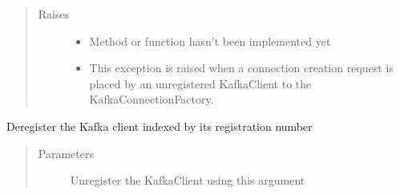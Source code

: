 \documentclass[letterpaper,10pt,english]{sphinxmanual}
\begin{document}
\begin{fulllineitems}
\begin{fulllineitems}
\begin{quote}
\begin{description}
\item[{Raises}] \leavevmode\begin{itemize}
\item {} 
\sphinxAtStartPar
{} \textendash{} Method or function hasn’t been implemented yet

\item {} 
\sphinxAtStartPar
{\hyperref[\detokenize{Forge:Forge.KafkaClientNotRegisteredError}]{}} \textendash{} This exception is raised when a connection creation request is placed by an
    unregistered KafkaClient to the KafkaConnectionFactory.

\end{itemize}

\end{description}\end{quote}

\end{fulllineitems}


\begin{fulllineitems}
\label{\detokenize{Forge:Forge.KafkaConnectionFactory.de_register}}
\sphinxAtStartPar
De\sphinxhyphen{}register the Kafka client indexed by its registration number
\begin{quote}\begin{description}
\item[{Parameters}] \leavevmode
\sphinxAtStartPar
{} \textendash{} Unregister the KafkaClient using this argument

\end{description}\end{quote}

\end{fulllineitems}



\end{fulllineitems}
\end{document}
